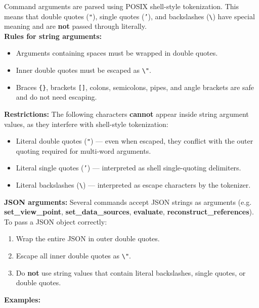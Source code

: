 Command arguments are parsed using POSIX shell-style tokenization.
This means that double quotes (\texttt{"}), single quotes (\texttt{'}),
and backslashes (\texttt{\textbackslash}) have special meaning and are
\textbf{not} passed through literally. \\

\textbf{Rules for string arguments:}
\begin{itemize}
    \item Arguments containing spaces must be wrapped in double quotes.
    \item Inner double quotes must be escaped as \texttt{\textbackslash"}.
    \item Braces \texttt{\{\}}, brackets \texttt{[]}, colons, semicolons,
          pipes, and angle brackets are safe and do not need escaping.
\end{itemize}

\textbf{Restrictions:} The following characters \textbf{cannot} appear
inside string argument values, as they interfere with shell-style tokenization:
\begin{itemize}
    \item Literal double quotes (\texttt{"}) --- even when escaped, they
          conflict with the outer quoting required for multi-word arguments.
    \item Literal single quotes (\texttt{'}) --- interpreted as shell
          single-quoting delimiters.
    \item Literal backslashes (\texttt{\textbackslash}) --- interpreted as
          escape characters by the tokenizer.
\end{itemize}

\textbf{JSON arguments:} Several commands accept JSON strings as arguments
(e.g. \textbf{set\_view\_point}, \textbf{set\_data\_sources},
\textbf{evaluate}, \textbf{reconstruct\_references}).
To pass a JSON object correctly: \\

\begin{enumerate}
    \item Wrap the entire JSON in outer double quotes.
    \item Escape all inner double quotes as \texttt{\textbackslash"}.
    \item Do \textbf{not} use string values that contain literal backslashes,
          single quotes, or double quotes.
\end{enumerate}

\textbf{Examples:} \\


